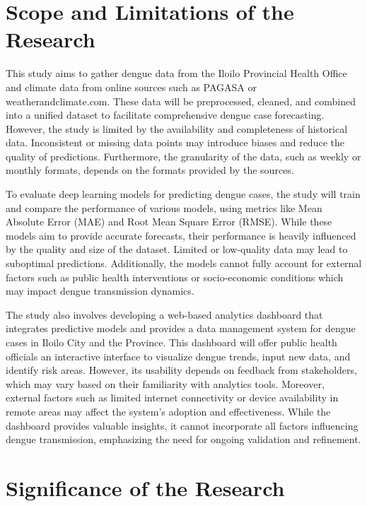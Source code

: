 \section{Scope and Limitations of the Research}
\label{sec:scopelimitations}

This study aims to gather dengue data from the Iloilo Provincial Health Office and climate data from online sources such as PAGASA or weatherandclimate.com. These data will be preprocessed, cleaned, and combined into a unified dataset to facilitate comprehensive dengue case forecasting. However, the study is limited by the availability and completeness of historical data. Inconsistent or missing data points may introduce biases and reduce the quality of predictions. Furthermore, the granularity of the data, such as weekly or monthly formats, depends on the formats provided by the sources.

To evaluate deep learning models for predicting dengue cases, the study will train and compare the performance of various models, using metrics like Mean Absolute Error (MAE) and Root Mean Square Error (RMSE). While these models aim to provide accurate forecasts, their performance is heavily influenced by the quality and size of the dataset. Limited or low-quality data may lead to suboptimal predictions. Additionally, the models cannot fully account for external factors such as public health interventions or socio-economic conditions which may impact dengue transmission dynamics.

The study also involves developing a web-based analytics dashboard that integrates predictive models and provides a data management system for dengue cases in Iloilo City and the Province. This dashboard will offer public health officials an interactive interface to visualize dengue trends, input new data, and identify risk areas. However, its usability depends on feedback from stakeholders, which may vary based on their familiarity with analytics tools. Moreover, external factors such as limited internet connectivity or device availability in remote areas may affect the system's adoption and effectiveness. While the dashboard provides valuable insights, it cannot incorporate all factors influencing dengue transmission, emphasizing the need for ongoing validation and refinement.


\section{Significance of the Research}
\label{sec:significance}

